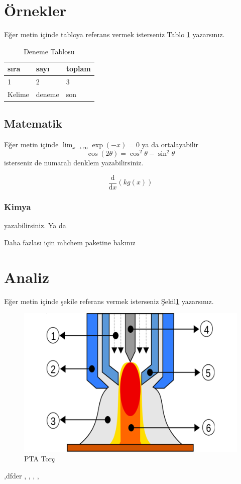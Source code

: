 \lipsum[1-2]
\section{Örnekler}
Eğer metin içinde tabloya referans vermek isterseniz Tablo \ref{tab:den} yazarsınız. 
\begin{table}[h]
\centering
\caption{Deneme Tablosu} \label{tab:den}
\begin{tabular}{|l|l|l|}
\hline
sıra   & sayı   & toplam \\ \hline
1      & 2      & 3      \\ \hline
Kelime & deneme & son    \\ \hline
\end{tabular}
\end{table}

\subsection{Matematik}
Eğer metin içinde \(\lim_{x \to \infty} \exp(-x) = 0\) ya da ortalayabilir
\begin{displaymath}
\cos (2\theta) = \cos^2 \theta - \sin^2 \theta
\end{displaymath}
isterseniz de numaralı denklem yazabilirsiniz.

\begin{equation}
\frac{\mathrm d}{\mathrm d x} \left( k g(x) \right)
\end{equation}
\subsubsection{Kimya}
 yazabilirsiniz. Ya da


Daha fazlası için mhchem paketine bakınız
 
\section{Analiz}
Eğer metin içinde şekile referans vermek isterseniz Şekil\ref{fig:PtaTorc} yazarsınız. 
\begin{figure}[h]
\caption{PTA Torç}\label{fig:PtaTorc}
\includegraphics[width=\textwidth]{gorseller/ptaTorc}
\end{figure}
\lipsum[1-2]
\parencite{celik_microstructure_2013} \parencite{gatto_plasma_2004}
\cite{celik_effects_2011}

\cite{yazdi_microstructure_2015},dfder \cite{keehan_influence_2006}, \cite{guo_microstructure_2014}, \cite{kim_variation_2013}, \cite{xibao_metallurgical_2005-1}, \cite{jin_effect_1997}